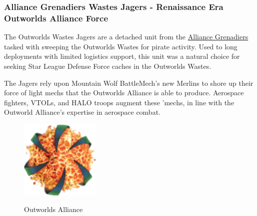\subsubsection{Alliance Grenadiers Wastes Jagers - Renaissance Era Outworlds Alliance Force}

The Outworlds Wastes Jagers are a detached unit from the \href{https://www.sarna.net/wiki/Alliance_Grenadiers}{Alliance Grenadiers} tasked with sweeping the Outworlds Wastes for pirate activity.
Used to long deployments with limited logistics support, this unit was a natural choice for seeking Star League Defense Force caches in the Outworlds Wastes.

The Jagers rely upon Mountain Wolf BattleMech's new Merlins to shore up their force of light mechs that the Outworlds Alliance is able to produce.
Aerospace fighters, VTOLs, and HALO troops augment these 'mechs, in line with the Outworld Alliance's expertise in aerospace combat.

\begin{figure}[!h]
  \centering
  \includegraphics[alt='Outworlds Alliance Logo', width=1.5in, height=1.486in]{img/Outworlds-Alliance.png}
  \caption*{Outworlds Alliance}
\end{figure}


